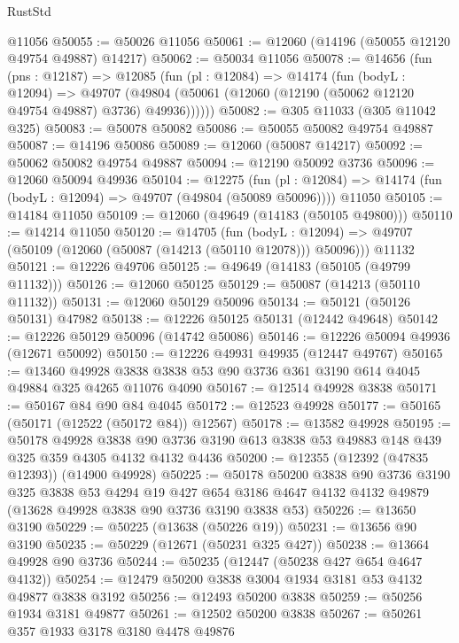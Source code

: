 \begin{lexlean}{RustStd}
\begin{coremodule}
    @11056
@50055 := @50026 @11056
@50061 := @12060 (@14196 (@50055 @12120 @49754 @49887) @14217)
@50062 := @50034 @11056
@50078 := @14656
    (fun (pns : @12187) =>
    @12085
      (fun (pl : @12084) =>
      @14174
        (fun (bodyL : @12094) =>
        @49707 (@49804 (@50061 (@12060 (@12190 (@50062 @12120 @49754 @49887) @3736) @49936))))))
@50082 := @305 @11033 (@305 @11042 @325)
@50083 := @50078 @50082
@50086 := @50055 @50082 @49754 @49887
@50087 := @14196 @50086
@50089 := @12060 (@50087 @14217)
@50092 := @50062 @50082 @49754 @49887
@50094 := @12190 @50092 @3736
@50096 := @12060 @50094 @49936
@50104 := @12275
    (fun (pl : @12084) => @14174 (fun (bodyL : @12094) => @49707 (@49804 (@50089 @50096))))
    @11050
@50105 := @14184 @11050
@50109 := @12060 (@49649 (@14183 (@50105 @49800)))
@50110 := @14214 @11050
@50120 := @14705
    (fun (bodyL : @12094) => @49707 (@50109 (@12060 (@50087 (@14213 (@50110 @12078))) @50096)))
    @11132
@50121 := @12226 @49706
@50125 := @49649 (@14183 (@50105 (@49799 @11132)))
@50126 := @12060 @50125
@50129 := @50087 (@14213 (@50110 @11132))
@50131 := @12060 @50129 @50096
@50134 := @50121 (@50126 @50131) @47982
@50138 := @12226 @50125 @50131 (@12442 @49648)
@50142 := @12226 @50129 @50096 (@14742 @50086)
@50146 := @12226 @50094 @49936 (@12671 @50092)
@50150 := @12226 @49931 @49935 (@12447 @49767)
@50165 := @13460
    @49928
    @3838
    @3838
    @53
    @90
    @3736
    @361
    @3190
    @614
    @4045
    @49884
    @325
    @4265
    @11076
    @4090
@50167 := @12514 @49928 @3838
@50171 := @50167 @84 @90 @84 @4045
@50172 := @12523 @49928
@50177 := @50165 (@50171 (@12522 (@50172 @84)) @12567)
@50178 := @13582 @49928
@50195 := @50178
    @49928
    @3838
    @90
    @3736
    @3190
    @613
    @3838
    @53
    @49883
    @148
    @439
    @325
    @359
    @4305
    @4132
    @4132
    @4436
@50200 := @12355 (@12392 (@47835 @12393)) (@14900 @49928)
@50225 := @50178
    @50200
    @3838
    @90
    @3736
    @3190
    @325
    @3838
    @53
    @4294
    @19
    @427
    @654
    @3186
    @4647
    @4132
    @4132
    @49879
    (@13628 @49928 @3838 @90 @3736 @3190 @3838 @53)
@50226 := @13650 @3190
@50229 := @50225 (@13638 (@50226 @19))
@50231 := @13656 @90 @3190
@50235 := @50229 (@12671 (@50231 @325 @427))
@50238 := @13664 @49928 @90 @3736
@50244 := @50235 (@12447 (@50238 @427 @654 @4647 @4132))
@50254 := @12479 @50200 @3838 @3004 @1934 @3181 @53 @4132 @49877 @3838 @3192
@50256 := @12493 @50200 @3838
@50259 := @50256 @1934 @3181 @49877
@50261 := @12502 @50200 @3838
@50267 := @50261 @357 @1933 @3178 @3180 @4478 @49876

\end{coremodule}
\end{lexlean}
